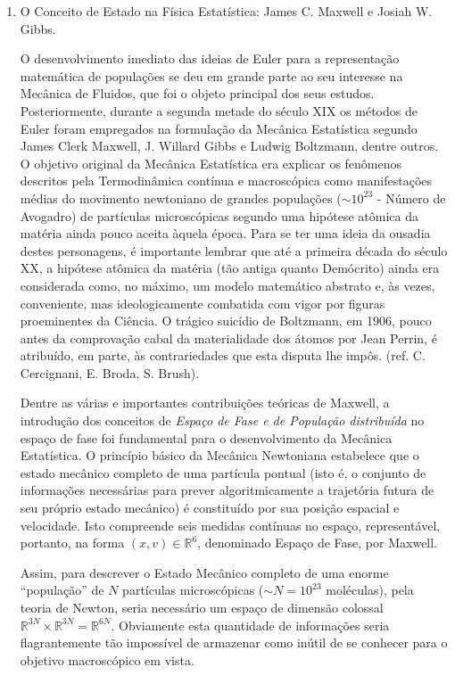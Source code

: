 {\begin{enumerate}
\item O Conceito de Estado na Física Estatística: James C. Maxwell e Josiah W. Gibbs.

 O desenvolvimento imediato das ideias de Euler para a representação matemática de populações se deu em grande parte ao seu interesse na Mecânica de Fluidos, que foi o objeto principal dos seus estudos. Posteriormente, durante a segunda metade do século XIX os métodos de Euler foram empregados na formulação da Mecânica Estatística segundo James Clerk Maxwell, J. Willard Gibbs e Ludwig Boltzmann, dentre outros. O objetivo original da Mecânica Estatística era explicar os fenômenos descritos pela Termodinâmica contínua e macroscópica como manifestações médias do movimento newtoniano de grandes populações (\(\sim10^{23}\) - Número de Avogadro) de partículas microscópicas segundo uma hipótese atômica da matéria ainda pouco aceita àquela época. Para se ter uma ideia da ousadia destes personagens, é importante lembrar que até a primeira década do século XX, a hipótese atômica da matéria (tão antiga quanto Demócrito) ainda era considerada como, no máximo, um modelo matemático abstrato e, às vezes, conveniente, mas ideologicamente combatida com vigor por figuras proeminentes da Ciência. O trágico suicídio de Boltzmann, em 1906, pouco antes da comprovação cabal da materialidade dos átomos por Jean Perrin, é atribuído, em parte, às contrariedades que esta disputa lhe impôs. (ref. C. Cercignani, E. Broda, S. Brush).

Dentre as várias e importantes contribuições teóricas de Maxwell, a introdução dos conceitos de \textit{Espaço de Fase e de População distribuída} no espaço de fase foi fundamental para o desenvolvimento da Mecânica Estatística. O princípio básico da Mecânica Newtoniana estabelece que o estado mecânico completo de uma partícula pontual (isto é, o conjunto de informações necessárias para prever algoritmicamente a trajetória futura de seu próprio estado mecânico) é constituído por sua posição espacial e velocidade. Isto compreende seis medidas contínuas no espaço, representável, portanto, na forma \((x, v) \in \mathbb{R}^6\), denominado Espaço de Fase, por Maxwell.

Assim, para descrever o Estado Mecânico completo de uma enorme ``população'' de \(N\) partículas microscópicas (\(\sim N = 10^{23}\) moléculas), pela teoria de Newton, seria necessário um espaço de dimensão colossal \(\mathbb{R}^{3N} \times \mathbb{R}^{3N} = \mathbb{R}^{6N}\). Obviamente esta quantidade de informações seria flagrantemente tão impossível de armazenar como inútil de se conhecer para o objetivo macroscópico em vista.


\end{enumerate}}
